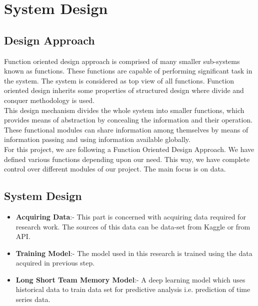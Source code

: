 \chapter{System Design}

\section{Design Approach}

Function oriented design approach is comprised of many smaller sub-systems known as functions. These functions are capable of performing significant task in the system. The system is considered as top view of all functions.
Function oriented design inherits some properties of structured design where divide and conquer methodology is used.\\
This design mechanism divides the whole system into smaller functions, which provides means of abstraction by concealing the information and their operation. These functional modules can share information among themselves by means of information passing and using information available globally.\\
For this project, we are following a Function Oriented Design Approach. We have defined various functions depending upon our need. This way, we have complete control over different modules of our project. The main focus is on data. 




\section{System Design}
    \begin{itemize}
        \item \textbf{Acquiring Data}:- This part is concerned with acquiring data required for research work. The sources of this data can be data-set from Kaggle or from API.
        
        \item \textbf{Training Model}:- The model used in this research is trained using the data acquired in previous step. 
        
        \item \textbf{Long Short Team Memory Model}:- A deep learning model which uses historical data to train data set for predictive analysis i.e. prediction of time series data.
    \end{itemize} 

\newpage

